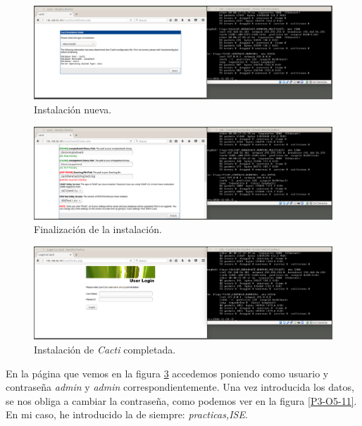 \documentclass[a4paper,titlepage,12pt]{report}	%
\numberwithin{figure}{section} %
\numberwithin{table}{section} %
\begin{document}
	\begin{figure}[H]
	   \includegraphics[width=\linewidth]{./Imagenes/P3/O5-8.png}
	   \vspace{-0.5cm}
	   \caption[Instalación nueva.]{Instalación nueva.}
	   \label{P3-O5-8}
	\end{figure}

	\begin{figure}[H]
	   \includegraphics[width=\linewidth]{./Imagenes/P3/O5-9.png}
	   \vspace{-0.5cm}
	   \caption[Finalización de la instalación.]{Finalización de la instalación.}
	   \label{P3-O5-9}
	\end{figure}

	\begin{figure}[H]
	   \includegraphics[width=\linewidth]{./Imagenes/P3/O5-10.png}
	   \vspace{-0.5cm}
	   \caption[Instalación de \textit{Cacti} completada.]{Instalación de \textit{Cacti} completada.}
	   \label{P3-O5-10}
	\end{figure}

	En la página que vemos en la figura \ref{P3-O5-10} accedemos poniendo como usuario y contraseña \textit{admin} y \textit{admin} correspondientemente. Una vez introducida los datos, se nos obliga a cambiar la contraseña, como podemos ver en la figura \ref{P3-O5-11}. En mi caso, he introducido la de siempre: \textit{practicas,ISE}.
\end{document}
